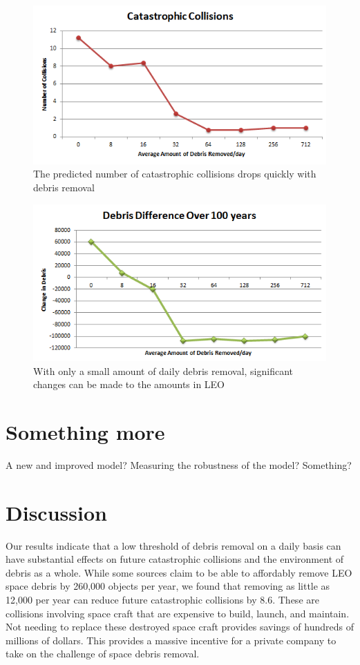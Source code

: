 \documentclass[pre,12pt]{revtex4-1}
\begin{document}
\begin{figure}[h!]
	\includegraphics[width=.75\textwidth]{"Figures/results_collisions"}
	\caption{The predicted number of catastrophic collisions drops quickly with debris removal}
	\label{fig:reducecol}
\end{figure}
\begin{figure}[h!]
	\includegraphics[width=.75\textwidth]{"Figures/results_difference"}
	\caption{With only a small amount of daily debris removal, significant changes can be made to the amounts in LEO}
	\label{fig:diffdebris}
\end{figure}

\section{Something more}\label{Something}

A new and improved model? Measuring the robustness of the model? Something? 


\section{Discussion}\label{Discussion}

Our results indicate that a low threshold of debris removal on a daily basis can have substantial effects on future catastrophic collisions and the environment of debris as a whole. While some sources claim to be able to affordably remove LEO space debris by 260,000 objects per year, we found that removing as little as 12,000 per year can reduce future catastrophic collisions by 8.6. These are collisions involving space craft that are expensive to build, launch, and maintain. Not needing to replace these destroyed space craft provides savings of hundreds of millions of dollars. This provides a massive incentive for a private company to take on the challenge of space debris removal.
\end{document}
